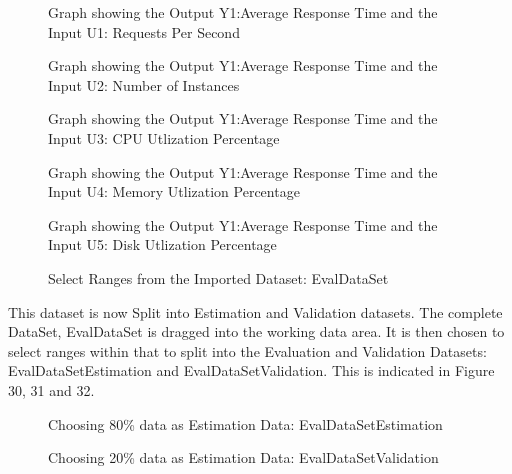\documentclass[article,type=msc,colorback,12pt,accentcolor=tud7b,table]{tudthesis}
\begin{document}
\begin{figure}[H]
	\begin{center}
		\makebox[\textwidth]{\texttt{[image: E17]}}
	\end{center}
	\caption{Graph showing the Output Y1:Average Response Time and the Input U1: Requests Per Second}
	\begin{center}
		\makebox[\textwidth]{\texttt{[image: E18]}}
		\end{center}
	\caption{Graph showing the Output Y1:Average Response Time and the Input U2: Number of Instances}
\end{figure}

\begin{figure}[H]
	\begin{center}
		\makebox[\textwidth]{\texttt{[image: E19]}}
	\end{center}
	\caption{Graph showing the Output Y1:Average Response Time and the Input U3: CPU Utlization Percentage}
	\begin{center}
		\makebox[\textwidth]{\texttt{[image: E20]}}
	\end{center}
	\caption{Graph showing the Output Y1:Average Response Time and the Input U4: Memory Utlization Percentage}
\end{figure}

\begin{figure}[H]
	\begin{center}
		\makebox[\textwidth]{\texttt{[image: E21]}}
	\end{center}
	\caption{Graph showing the Output Y1:Average Response Time and the Input U5: Disk Utlization Percentage}
  	\begin{center}
  		\makebox[\textwidth]{\texttt{[image: E7]}}
  	\end{center}
  	\caption{Select Ranges from the Imported Dataset: EvalDataSet}
\end{figure}
	
This dataset is now Split into Estimation and Validation datasets. The complete DataSet, EvalDataSet is dragged into the working data area. It is then chosen to select ranges within that to 	split into the Evaluation and Validation Datasets: EvalDataSetEstimation and EvalDataSetValidation. This is indicated in Figure 30, 31 and 32.
  \begin{figure}[H]
	  	  	  	\begin{center}
	  	  	  		\makebox[\textwidth]{\texttt{[image: E8]}}
	  	  	  	\end{center}
	  	  	  	\caption{Choosing 80\% data as Estimation Data: EvalDataSetEstimation}

    	\begin{center}
    		\makebox[\textwidth]{\texttt{[image: E9]}}
    	\end{center}
    	\caption{Choosing 20\% data as Estimation Data: EvalDataSetValidation}
    \end{figure}	
	
\end{document}
